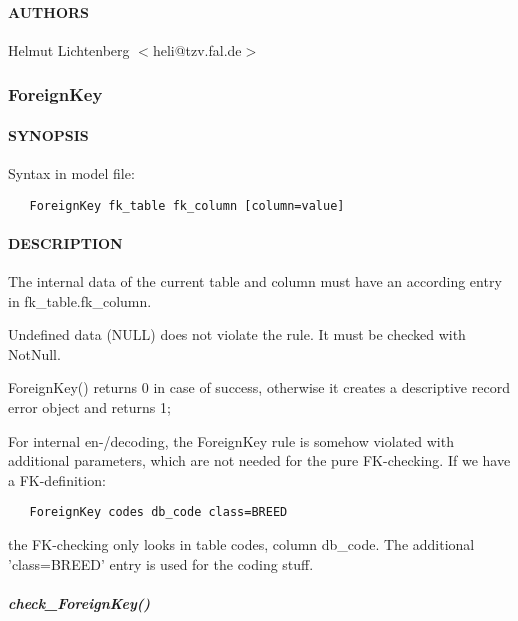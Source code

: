 \paragraph*{AUTHORS\label{DateDiff_AUTHORS}}


Helmut Lichtenberg $<$heli@tzv.fal.de$>$

\subsubsection{ForeignKey\label{ForeignKey}}




\paragraph*{SYNOPSIS\label{ForeignKey_SYNOPSIS}}


Syntax in model file:

\begin{verbatim}
   ForeignKey fk_table fk_column [column=value]
\end{verbatim}
\paragraph*{DESCRIPTION\label{ForeignKey_DESCRIPTION}}


The internal data of the current table and column must have an according
entry in fk\_table.fk\_column.



Undefined data (NULL) does not violate the rule. It must be checked with
NotNull.



ForeignKey() returns 0 in case of success, otherwise it creates a
descriptive record error object and returns 1;



For internal en-/decoding, the ForeignKey rule is somehow violated with
additional parameters, which are not needed for the pure
FK-checking. If we have a FK-definition:

\begin{verbatim}
   ForeignKey codes db_code class=BREED
\end{verbatim}


the FK-checking only looks in table codes, column db\_code. The additional
'class=BREED' entry is used for the coding stuff.

\subparagraph*{check\_ForeignKey()\label{ForeignKey_check_ForeignKey_}}


